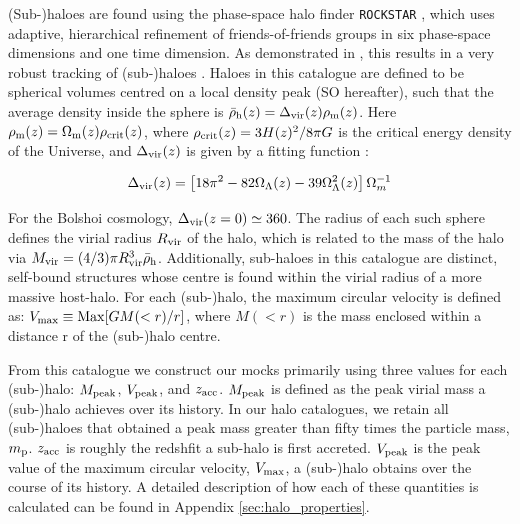 \documentclass[a4paper,fleqn,usenatbib]{mnras}
\begin{document}
(Sub-)haloes are found using the phase-space halo finder {\tt ROCKSTAR} \citep{Behroozi:2013cn, Behroozi:2013dz}, which uses adaptive, hierarchical refinement of friends-of-friends groups in six phase-space dimensions and one time dimension. As demonstrated in \cite{Knebe:2011jc, Knebe:2013bp}, this results in a very robust tracking of (sub-)haloes \citep[also see][]{vandenBosch:2014tl}. Haloes in this catalogue are defined to be spherical volumes centred on a local density peak (SO hereafter), such that the average density inside the sphere is $\bar{\rho}_{\rm h}(z) = \Delta_{\rm vir}(z)\rho_{\rm m}(z)$.  Here $\rho_{\rm m}(z) = \Omega_{\rm m}(z) \rho_{\rm crit}(z)$, where $\rho_{\rm crit}(z) = 3H(z)^2/8\pi G$ is the critical energy density of the Universe, and $\Delta_{\rm vir}(z)$ is given by a fitting function \citep{Bryan:1998cc}:
%
\begin{linenomath}
\begin{equation}
\Delta_{\rm vir}(z) = \left[ 18\pi^2 - 82\Omega_{\Lambda}(z) - 39\Omega_{\Lambda}^2(z) \right]\Omega_m^{-1}
\end{equation}
\end{linenomath}
%
For the Bolshoi cosmology, $\Delta_{\rm vir}(z=0)\simeq 360$.  The radius of each such sphere defines the virial radius $R_{\rm vir}$ of the halo, which is related to the mass of the halo via $M_{\rm vir} = (4/3)\pi R_{\rm vir}^3\bar{\rho}_{\rm h}$. Additionally, sub-haloes in this catalogue are distinct, self-bound structures whose centre is found within the virial radius of a more massive host-halo.  For each (sub-)halo, the maximum circular velocity is defined as: $V_{\rm max} \equiv {\rm Max}[GM(<r)/r]$, where $M(<r)$ is the mass enclosed within a distance r of the (sub-)halo centre.

From this catalogue we construct our mocks primarily using three values for each (sub-)halo: $M_{\rm peak}$, $V_{\rm peak}$, and $z_{\rm acc}$.  $M_{\rm peak}$ is defined as the peak virial mass a (sub-)halo achieves over its history.  In our halo catalogues, we retain all (sub-)haloes that obtained a peak mass greater than fifty times the particle mass, $m_{\rm p}$.  $z_{\rm acc}$ is roughly the redshfit a sub-halo is first accreted.  $V_{\rm peak}$ is the peak value of the maximum circular velocity, $V_{\rm max}$, a (sub-)halo obtains over the course of its history.  A detailed description of how each of these quantities is calculated can be found in Appendix \ref{sec:halo_properties}.
\end{document}
